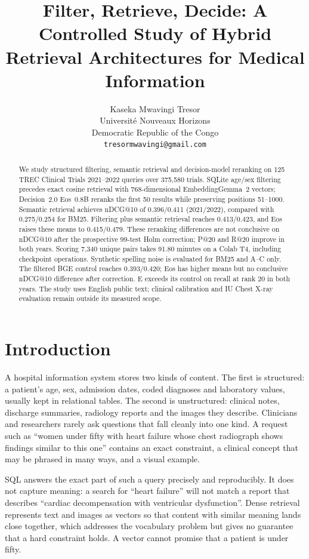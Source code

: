\documentclass{article}
\title{Filter, Retrieve, Decide: A Controlled Study of Hybrid\\Retrieval Architectures for Medical Information}
\author{
  Kaseka Mwavingi Tresor \\
  Université Nouveaux Horizons \\
  Democratic Republic of the Congo \\
  \texttt{tresormwavingi@gmail.com}
}
\begin{document}
\maketitle

\begin{abstract}
We study structured filtering, semantic retrieval and decision-model reranking on 125 TREC Clinical Trials 2021--2022 queries over 375{,}580 trials. SQLite age/sex filtering precedes exact cosine retrieval with 768-dimensional EmbeddingGemma~2 vectors; Decision~2.0 Eos~0.8B reranks the first 50 results while preserving positions 51--1000. Semantic retrieval achieves nDCG@10 of 0.396/0.411 (2021/2022), compared with 0.275/0.254 for BM25. Filtering plus semantic retrieval reaches 0.413/0.423, and Eos raises these means to 0.415/0.479. These reranking differences are not conclusive on nDCG@10 after the prospective 99-test Holm correction; P@20 and R@20 improve in both years. Scoring 7{,}340 unique pairs takes 91.80 minutes on a Colab T4, including checkpoint operations. Synthetic spelling noise is evaluated for BM25 and A--C only. The filtered BGE control reaches 0.393/0.420; Eos has higher means but no conclusive nDCG@10 difference after correction. E exceeds its control on recall at rank 20 in both years. The study uses English public text; clinical calibration and IU Chest X-ray evaluation remain outside its measured scope.
\end{abstract}

\section{Introduction}

A hospital information system stores two kinds of content. The first is structured: a patient's age, sex, admission dates, coded diagnoses and laboratory values, usually kept in relational tables. The second is unstructured: clinical notes, discharge summaries, radiology reports and the images they describe. Clinicians and researchers rarely ask questions that fall cleanly into one kind. A request such as ``women under fifty with heart failure whose chest radiograph shows findings similar to this one'' contains an exact constraint, a clinical concept that may be phrased in many ways, and a visual example.

SQL answers the exact part of such a query precisely and reproducibly. It does not capture meaning: a search for ``heart failure'' will not match a report that describes ``cardiac decompensation with ventricular dysfunction''. Dense retrieval represents text and images as vectors so that content with similar meaning lands close together, which addresses the vocabulary problem but gives no guarantee that a hard constraint holds. A vector cannot promise that a patient is under fifty.
\end{document}
